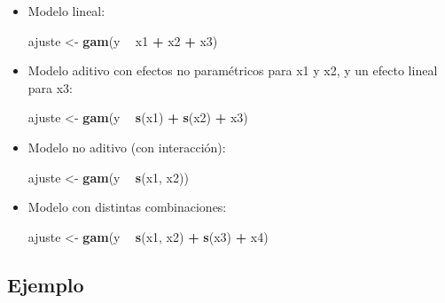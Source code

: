 \documentclass[]{book}
\newenvironment{Shaded}{\begin{snugshade}}{\end{snugshade}}
\newcommand{\KeywordTok}[1]{\textcolor[rgb]{0.13,0.29,0.53}{\textbf{#1}}}
\newcommand{\StringTok}[1]{\textcolor[rgb]{0.31,0.60,0.02}{#1}}
\newcommand{\OperatorTok}[1]{\textcolor[rgb]{0.81,0.36,0.00}{\textbf{#1}}}
\newcommand{\NormalTok}[1]{#1}
\begin{document}
\begin{itemize}
\item
  Modelo lineal:

\begin{Shaded}
\begin{Highlighting}[]
\NormalTok{ajuste <-}\StringTok{ }\KeywordTok{gam}\NormalTok{(y }\OperatorTok{~}\StringTok{ }\NormalTok{x1 }\OperatorTok{+}\StringTok{ }\NormalTok{x2 }\OperatorTok{+}\StringTok{ }\NormalTok{x3)}
\end{Highlighting}
\end{Shaded}
\item
  Modelo aditivo con efectos no paramétricos para x1 y x2, y un efecto
  lineal para x3:

\begin{Shaded}
\begin{Highlighting}[]
\NormalTok{ajuste <-}\StringTok{ }\KeywordTok{gam}\NormalTok{(y }\OperatorTok{~}\StringTok{ }\KeywordTok{s}\NormalTok{(x1) }\OperatorTok{+}\StringTok{ }\KeywordTok{s}\NormalTok{(x2) }\OperatorTok{+}\StringTok{ }\NormalTok{x3)}
\end{Highlighting}
\end{Shaded}
\item
  Modelo no aditivo (con interacción):

\begin{Shaded}
\begin{Highlighting}[]
\NormalTok{ajuste <-}\StringTok{ }\KeywordTok{gam}\NormalTok{(y }\OperatorTok{~}\StringTok{ }\KeywordTok{s}\NormalTok{(x1, x2))}
\end{Highlighting}
\end{Shaded}
\item
  Modelo con distintas combinaciones:

\begin{Shaded}
\begin{Highlighting}[]
\NormalTok{ajuste <-}\StringTok{ }\KeywordTok{gam}\NormalTok{(y }\OperatorTok{~}\StringTok{ }\KeywordTok{s}\NormalTok{(x1, x2) }\OperatorTok{+}\StringTok{ }\KeywordTok{s}\NormalTok{(x3) }\OperatorTok{+}\StringTok{ }\NormalTok{x4)}
\end{Highlighting}
\end{Shaded}
\end{itemize}

\subsection{Ejemplo}\label{ejemplo-3}
\end{document}
